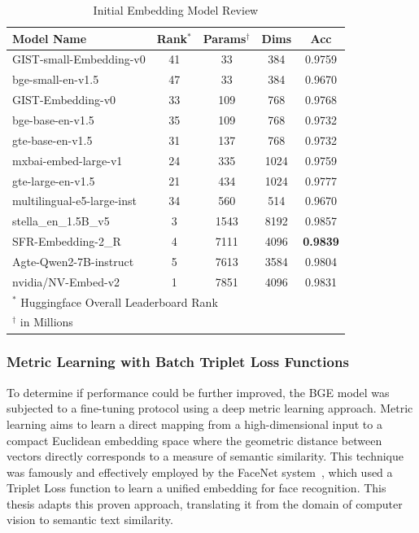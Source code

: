 \begin{table}[!tb]
    \captionsetup{skip=5pt}
    \centering
    \caption{Initial Embedding Model Review}
    \label{tbl:emb_models}
    \begin{tabular}{lcccc}
        \toprule
        Model Name                 & Rank$^{*}$ & Params$^{\dagger}$ & Dims & Acc             \\
        \midrule
        GIST-small-Embedding-v0    & 41         & 33                 & 384  & 0.9759          \\
        bge-small-en-v1.5          & 47         & 33                 & 384  & 0.9670          \\
        GIST-Embedding-v0          & 33         & 109                & 768  & 0.9768          \\
        bge-base-en-v1.5           & 35         & 109                & 768  & 0.9732          \\
        gte-base-en-v1.5           & 31         & 137                & 768  & 0.9732          \\
        mxbai-embed-large-v1       & 24         & 335                & 1024 & 0.9759          \\
        gte-large-en-v1.5          & 21         & 434                & 1024 & 0.9777          \\
        multilingual-e5-large-inst & 34         & 560                & 514  & 0.9670          \\
        stella\_en\_1.5B\_v5       & 3          & 1543               & 8192 & 0.9857          \\
        SFR-Embedding-2\_R         & 4          & 7111               & 4096 & \textbf{0.9839} \\
        Agte-Qwen2-7B-instruct     & 5          & 7613               & 3584 & 0.9804          \\
        nvidia/NV-Embed-v2         & 1          & 7851               & 4096 & 0.9831          \\
        \bottomrule
        \multicolumn{4}{p{6cm}}{\scriptsize $^{*}$ Huggingface Overall Leaderboard Rank} \\
        \multicolumn{4}{p{6cm}}{\scriptsize $^{\dagger}$ in Millions}
    \end{tabular}
\end{table}

\subsubsection{Metric Learning with Batch Triplet Loss Functions}\label{ch:3.3.1.2}
To determine if performance could be further improved, the BGE model was subjected to a fine-tuning protocol using a deep metric learning approach. Metric learning aims to learn a direct mapping from a high-dimensional input to a compact Euclidean embedding space where the geometric distance between vectors directly corresponds to a measure of semantic similarity. This technique was famously and effectively employed by the FaceNet system~\cite{Schroff_2015}, which used a Triplet Loss function to learn a unified embedding for face recognition. This thesis adapts this proven approach, translating it from the domain of computer vision to semantic text similarity.

